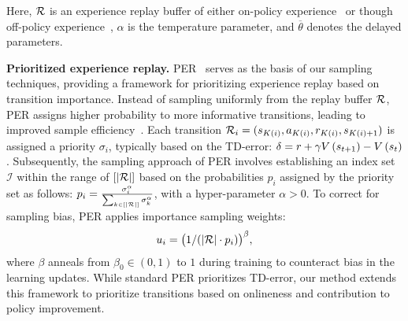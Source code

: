 Here, $\mathcal{R}$
is an experience replay buffer of either on-policy experience~\citep{sutton1999policy} or though off-policy experience~\citep{precup2000eligibility, munos2016safe}, $\alpha$ is the temperature parameter, and $\overline{\theta}$ denotes the delayed parameters.

































\textbf{Prioritized experience replay.} 
PER~\citep{schaul2015prioritized} serves as the basis of our sampling techniques, providing a framework for prioritizing experience replay based on transition importance. Instead of sampling uniformly from the replay buffer $\mathcal{R}$,  PER assigns higher probability to more informative transitions, leading to improved sample efficiency~\citep{hessel2018rainbow}. Each transition $\mathcal{R}_i = (s_{K(i)},a_{K(i)},r_{K(i)},s_{K(i)+1})$ is assigned a priority $\sigma_i$, typically based on the TD-error: $\delta=r+\gamma V \left( {s_{t+1}} \right) -V \left( {s_{t}} \right) $ \citep{schaul2015prioritized, hessel2018rainbow, brittain2019prioritized, van2019use, oh2021model}.
Subsequently, the sampling approach of PER involves establishing an index set $\mathcal{I}$ within the range of $\left[|\mathcal{R}|\right]$ based on the probabilities $p_i$ assigned by the priority set as follows:
    $p_i=\frac{\sigma_i^{\alpha}}{\sum_{k\in\left[|\mathcal{R}|\right]}\sigma_k^{\alpha}}$, 
with a hyper-parameter $\alpha>0$.
To correct for sampling bias, PER applies importance sampling weights:
\begin{equation}
\label{eq:weights}
u_i= \bigl ( {1}/ (|\mathcal{R}|\cdot p_i) \bigr)^{\beta},
\end{equation}
where $\beta$ anneals from $\beta_0 \in (0,1)$ to $1$ during training to counteract bias in the learning updates. While standard PER prioritizes TD-error, our method extends this framework to prioritize transitions based on onlineness and contribution to policy improvement.


